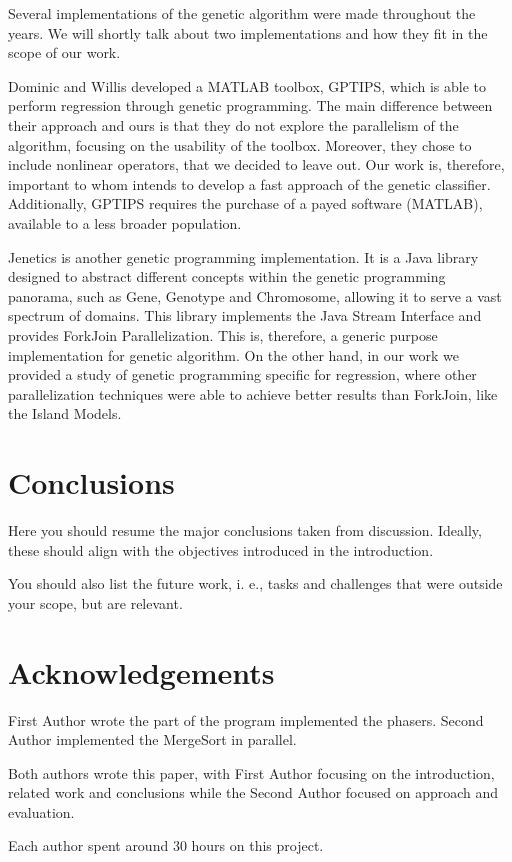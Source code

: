 \documentclass[runningheads]{llncs}
\begin{document}
Several implementations of the genetic algorithm were made throughout the years. We will shortly talk about two implementations and how they fit in the scope of our work.

Dominic and Willis  \cite{GPTIPS} developed a MATLAB toolbox, GPTIPS, which is able to perform regression through genetic programming. The main difference between their approach and  ours is that they do not explore the parallelism of the algorithm, focusing on the usability of the toolbox. Moreover, they chose to include nonlinear operators, that we decided to leave out. Our work is, therefore, important to whom intends to develop a fast approach of the genetic classifier. Additionally, GPTIPS requires the purchase of a payed software (MATLAB), available to a less broader population.

Jenetics \cite{jenetics} is another genetic programming implementation. It is a Java library designed to abstract different concepts within the genetic programming panorama, such as Gene, Genotype and Chromosome, allowing it to serve a vast spectrum of domains. This library implements the Java Stream Interface and provides ForkJoin Parallelization. This is, therefore, a generic purpose implementation for genetic algorithm. On the other hand, in our work we provided a study of genetic programming specific for regression, where other parallelization techniques were able to achieve better results than ForkJoin, like the Island Models.

\section{Conclusions}

Here you should resume the major conclusions taken from discussion. Ideally, these should align with the objectives introduced in the introduction.


You should also list the future work, i. e., tasks and challenges that were outside your scope, but are relevant.

\section*{Acknowledgements}

First Author wrote the part of the program implemented the phasers. Second Author implemented the MergeSort in parallel. 

Both authors wrote this paper, with First Author focusing on the introduction, related work and conclusions while the Second Author focused on approach and evaluation.

Each author spent around 30 hours on this project.



\end{document}

